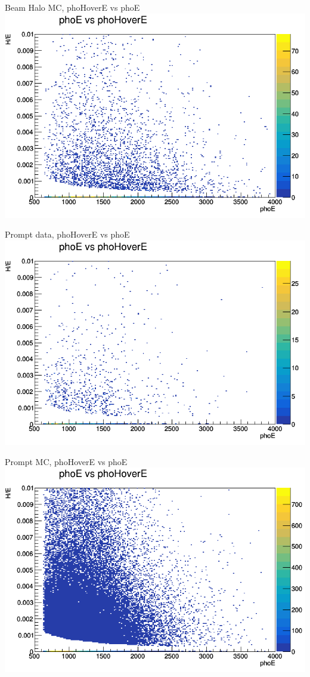 \documentclass{beamer}
\begin{document}
\begin{frame}{Beam Halo MC, phoHoverE vs phoE}
    \includegraphics[width=\linewidth]{phoE_vs_phoHoverE_anTGCtree_MC_beamhalo.png}
\end{frame}
\begin{frame}{Prompt data, phoHoverE vs phoE}
    \includegraphics[width=\linewidth]{phoE_vs_phoHoverE_anTGCtree_data_promptall.png}
\end{frame}
\begin{frame}{Prompt MC, phoHoverE vs phoE}
    \includegraphics[width=\linewidth]{phoE_vs_phoHoverE_anTGCtree_MC_prompt.png}
\end{frame}
\end{document}
